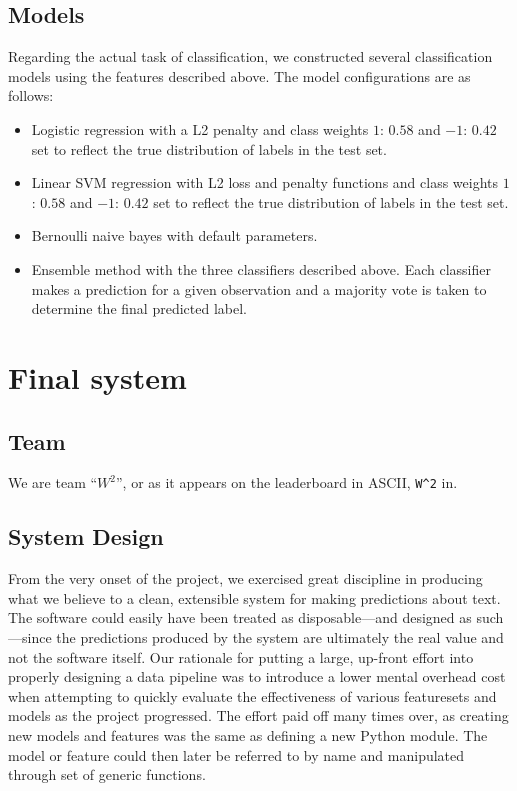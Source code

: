 \documentclass[
10pt, %
a4paper, %
oneside, %
headinclude,footinclude, %
BCOR5mm, %
]{scrartcl}
\begin{document}

\subsection{Models}
Regarding the actual task of classification, we constructed several 
classification models using the features described above. The model 
configurations are as follows:

\begin{itemize}
	\item Logistic regression with a L2 penalty and class weights $1$: $0.58$ and
	$-1$: $0.42$ set to reflect the true distribution of labels in the test set.

	\item Linear SVM regression with L2 loss and penalty functions and class 
	weights $1$: $0.58$ and $-1$: $0.42$ set to reflect the true distribution of
	labels in the test set.

	\item Bernoulli naive bayes with default parameters.

	\item Ensemble method with the three classifiers described above. Each 
	classifier makes a prediction for a given observation and a majority vote is
	taken to determine the final predicted label.
\end{itemize}


\section{Final system}

\subsection{Team}

We are team ``$W^2$'', or as it appears on the leaderboard in ASCII,
\texttt{W\string^2} in.

\subsection{System Design}

From the very onset of the project, we exercised great discipline in producing
what we believe to a clean, extensible system for making predictions about text.
The software could easily have been treated as disposable---and designed as such
---since the predictions produced by the system are ultimately the real value
and not the software itself. Our rationale for putting a large, up-front effort
into properly designing a data pipeline was to introduce a lower mental overhead
cost when attempting to quickly evaluate the effectiveness of various
featuresets and models as the project progressed. The effort paid off many times
over, as creating new models and features was the same as defining a new Python
module. The model or feature could then later be referred to by name and
manipulated through set of generic functions.
\end{document}

